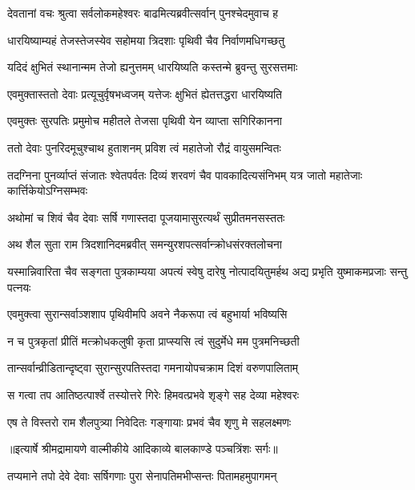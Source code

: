 \twolineshloka
{देवतानां वचः श्रुत्वा सर्वलोकमहेश्वरः}
{बाढमित्यब्रवीत्सर्वान् पुनश्चेदमुवाच ह} %

\twolineshloka
{धारयिष्याम्यहं तेजस्तेजस्येव सहोमया}
{त्रिदशाः पृथिवी चैव निर्वाणमधिगच्छतु} %

\twolineshloka
{यदिदं क्षुभितं स्थानान्मम तेजो ह्यनुत्तमम्}
{धारयिष्यति कस्तन्मे ब्रुवन्तु सुरसत्तमाः} %

\twolineshloka
{एवमुक्तास्ततो देवाः प्रत्यूचुर्वृषभध्वजम्}
{यत्तेजः क्षुभितं ह्येतत्तद्धरा धारयिष्यति} %

\twolineshloka
{एवमुक्तः सुरपतिः प्रमुमोच महीतले}
{तेजसा पृथिवी येन व्याप्ता सगिरिकानना} %

\twolineshloka
{ततो देवाः पुनरिदमूचुश्चाथ हुताशनम्}
{प्रविश त्वं महातेजो रौद्रं वायुसमन्वितः} %

\threelineshloka
{तदग्निना पुनर्व्याप्तं संजातः श्वेतपर्वतः}
{दिव्यं शरवणं चैव पावकादित्यसंनिभम्}
{यत्र जातो महातेजाः कार्त्तिकेयोऽग्निसम्भवः} %

\twolineshloka
{अथोमां च शिवं चैव देवाः सर्षि गणास्तदा}
{पूजयामासुरत्यर्थं सुप्रीतमनसस्ततः} %

\twolineshloka
{अथ शैल सुता राम त्रिदशानिदमब्रवीत्}
{समन्युरशपत्सर्वान्क्रोधसंरक्तलोचना} %

\threelineshloka
{यस्मान्निवारिता चैव सङ्गता पुत्रकाम्यया}
{अपत्यं स्वेषु दारेषु नोत्पादयितुमर्हथ}
{अद्य प्रभृति युष्माकमप्रजाः सन्तु पत्नयः} %

\twolineshloka
{एवमुक्त्वा सुरान्सर्वाञ्शशाप पृथिवीमपि}
{अवने नैकरूपा त्वं बहुभार्या भविष्यसि} %

\twolineshloka
{न च पुत्रकृतां प्रीतिं मत्क्रोधकलुषी कृता}
{प्राप्स्यसि त्वं सुदुर्मेधे मम पुत्रमनिच्छती} %

\twolineshloka
{तान्सर्वान्व्रीडितान्दृष्ट्वा सुरान्सुरपतिस्तदा}
{गमनायोपचक्राम दिशं वरुणपालिताम्} %

\twolineshloka
{स गत्वा तप आतिष्ठत्पार्श्वे तस्योत्तरे गिरेः}
{हिमवत्प्रभवे शृङ्गे सह देव्या महेश्वरः} %

\twolineshloka
{एष ते विस्तरो राम शैलपुत्र्या निवेदितः}
{गङ्गायाः प्रभवं चैव शृणु मे सहलक्ष्मणः} %


{॥इत्यार्षे श्रीमद्रामायणे वाल्मीकीये आदिकाव्ये बालकाण्डे पञ्चत्रिंशः सर्गः॥}


\twolineshloka
{तप्यमाने तपो देवे देवाः सर्षिगणाः पुरा}
{सेनापतिमभीप्सन्तः पितामहमुपागमन्} %

